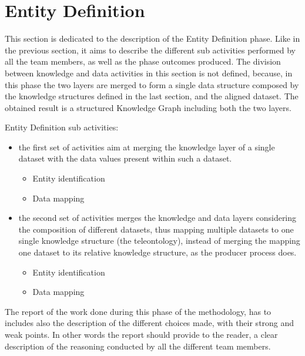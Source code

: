 \section{Entity Definition}
This section is dedicated to the description of the Entity Definition phase. Like in the previous section, it aims to describe the different sub activities performed by all the team members, as well as the phase outcomes produced. The division between knowledge and data activities in this section is not defined, because, in this phase the two layers are merged to form a single data structure composed by the knowledge structures defined in the last section, and the aligned dataset. The obtained result is a structured Knowledge Graph including both the two layers.


\noindent Entity Definition sub activities:
\begin{itemize}
    \item the first set of activities aim at merging the knowledge layer of a single dataset with the data values present within such a dataset.
    
    \begin{itemize}
            \item Entity identification 
            \item Data mapping
    \end{itemize}

    \item the second set of activities merges the knowledge and data layers considering the composition of different datasets, thus mapping multiple datasets to one single knowledge structure (the teleontology), instead of merging the mapping one dataset to its relative knowledge structure, as the producer process does.
    
    \begin{itemize}
            \item Entity identification 
            \item Data mapping
    \end{itemize}
\end{itemize}

\noindent The report of the work done during this phase of the methodology, has to includes also the description of the  different choices made, with their strong and weak points. In other words the report should provide to the reader, a clear description of the reasoning conducted by all the different team members.

